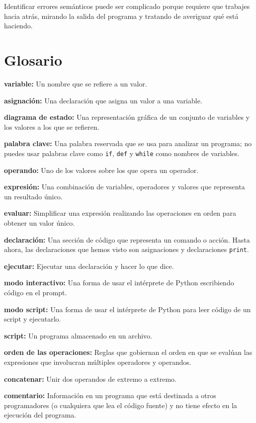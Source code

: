 \documentclass[12pt,letterpaper]{book}
\begin{document}
Identificar errores semánticos puede ser complicado porque requiere que trabajes hacia atrás, mirando la salida del programa y tratando de averiguar qué está haciendo.

\section{Glosario}

\textbf{variable:} Un nombre que se refiere a un valor.

\textbf{asignación:} Una declaración que asigna un valor a una variable.

\textbf{diagrama de estado:} Una representación gráfica de un conjunto de variables y los valores a los que se refieren.

\textbf{palabra clave:} Una palabra reservada que se usa para analizar un programa; no puedes usar palabras clave como \texttt{if}, \texttt{def} y \texttt{while} como nombres de variables.

\textbf{operando:} Uno de los valores sobre los que opera un operador.

\textbf{expresión:} Una combinación de variables, operadores y valores que representa un resultado único.

\textbf{evaluar:} Simplificar una expresión realizando las operaciones en orden para obtener un valor único.

\textbf{declaración:} Una sección de código que representa un comando o acción. Hasta ahora, las declaraciones que hemos visto son asignaciones y declaraciones \texttt{print}.

\textbf{ejecutar:} Ejecutar una declaración y hacer lo que dice.

\textbf{modo interactivo:} Una forma de usar el intérprete de Python escribiendo código en el prompt.

\textbf{modo script:} Una forma de usar el intérprete de Python para leer código de un script y ejecutarlo.

\textbf{script:} Un programa almacenado en un archivo.

\textbf{orden de las operaciones:} Reglas que gobiernan el orden en que se evalúan las expresiones que involucran múltiples operadores y operandos.

\textbf{concatenar:} Unir dos operandos de extremo a extremo.

\textbf{comentario:} Información en un programa que está destinada a otros programadores (o cualquiera que lea el código fuente) y no tiene efecto en la ejecución del programa.
\end{document}
